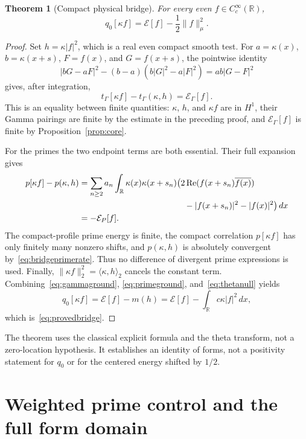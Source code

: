 \documentclass[11pt,a4paper]{article}
\numberwithin{equation}{section}
\newtheorem{theorem}{Theorem}[section]
\theoremstyle{definition}
\theoremstyle{remark}
\newcommand{\R}{\mathbb R}
\newcommand{\E}{\mathcal E}
\newcommand{\tg}{t_{\Gamma}}
\newcommand{\ip}[2]{\langle #1,#2\rangle}
\newcommand{\norm}[1]{\lVert #1\rVert}
\begin{document}
\begin{theorem}[Compact physical bridge]\label{thm:compactbridge}
For every even $f\in C_c^\infty(\R)$,
\begin{equation}\label{eq:provedbridge}
 q_0[\kappa f]=\E[f]-\frac12\norm{f}_\mu^2.
\end{equation}
\end{theorem}
\begin{proof}
Set $h=\kappa|f|^2$, which is a real even compact smooth test. For $a=\kappa(x)$, $b=\kappa(x+s)$, $F=f(x)$, and $G=f(x+s)$, the pointwise identity
\[
 |bG-aF|^2-(b-a)(b|G|^2-a|F|^2)=ab|G-F|^2
\]
gives, after integration,
\begin{equation}\label{eq:gammaground}
 \tg[\kappa f]-\tg(\kappa,h)=\E_\Gamma[f].
\end{equation}
This is an equality between finite quantities: $\kappa$, $h$, and $\kappa f$ are in $H^1$, their Gamma pairings are finite by the estimate in the preceding proof, and $\E_\Gamma[f]$ is finite by Proposition~\ref{prop:core}.

For the primes the two endpoint terms are both essential. Their full expansion gives
\begin{align}\label{eq:primeground}
 p[\kappa f]-p(\kappa,h)
 &=\sum_{n\ge2}a_n\int_\R\kappa(x)\kappa(x+s_n)
       \bigl(2\operatorname{Re}(f(x+s_n)\overline{f(x)})\notag\\
 &\hspace{44mm}-|f(x+s_n)|^2-|f(x)|^2\bigr)\,dx\notag\\
 &=-\E_P[f].
\end{align}
The compact-profile prime energy is finite, the compact correlation $p[\kappa f]$ has only finitely many nonzero shifts, and $p(\kappa,h)$ is absolutely convergent by~\eqref{eq:bridgeprimerate}. Thus no difference of divergent prime expressions is used. Finally,
$\norm{\kappa f}_2^2=\ip{\kappa}{h}_2$ cancels the constant term. Combining~\eqref{eq:gammaground}, \eqref{eq:primeground}, and~\eqref{eq:thetanull} yields
\[
 q_0[\kappa f]=\E[f]-m(h)
             =\E[f]-\int_\R c\kappa|f|^2\,dx,
\]
which is~\eqref{eq:provedbridge}.
\end{proof}

The theorem uses the classical explicit formula and the theta transform, not a zero-location hypothesis. It establishes an identity of forms, not a positivity statement for $q_0$ or for the centered energy shifted by $1/2$.

\section{Weighted prime control and the full form domain}\label{app:domain}\label{sec:prime}
\end{document}
